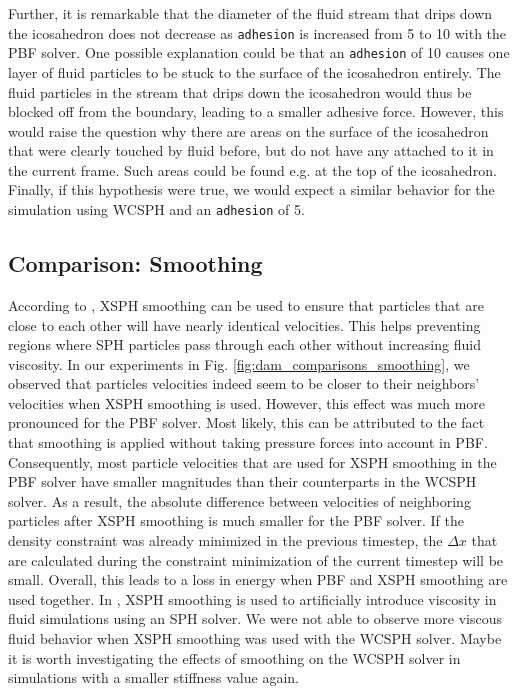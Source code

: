 \documentclass[11pt, letterpaper, twocolumn]{article}
\begin{document}
Further, it is remarkable that the diameter of the fluid stream that drips down the icosahedron does not decrease as \texttt{adhesion} is increased from 5 to 10 with the PBF solver. One possible explanation could be that an \texttt{adhesion} of 10 causes one layer of fluid particles to be stuck to the surface of the icosahedron entirely. The fluid particles
in the stream that drips down the icosahedron would thus be blocked off from the boundary, leading to a smaller adhesive force. However, this would raise the question why there are areas on the surface of the icosahedron that were clearly touched by fluid before, but do not have any attached to it in the current frame. Such areas could be found e.g. at the top
of the icosahedron. Finally, if this hypothesis were true, we would expect a similar behavior for the simulation using WCSPH and an \texttt{adhesion} of 5.

\subsection{Comparison: Smoothing}
According to \cite{monaghan1989}, XSPH smoothing can be used to ensure that particles that are close to each other will have nearly identical velocities. This helps preventing regions where SPH particles pass through each other without increasing fluid viscosity. In our experiments in Fig. \ref{fig:dam_comparisons_smoothing}, we observed that particles velocities 
indeed seem to be closer to their neighbors' velocities when XSPH smoothing is used. However, this effect was much more pronounced for the PBF solver. Most likely, this can be attributed to the fact that smoothing is applied without taking pressure forces into account in PBF. Consequently, most particle velocities that are used for XSPH smoothing in the PBF solver have smaller
magnitudes than their counterparts in the WCSPH solver. As a result, the absolute difference between velocities of neighboring particles after XSPH smoothing is much smaller for the PBF solver. If the density constraint was already minimized in the previous timestep, the $\Delta x$ that are calculated during the constraint minimization of the current timestep will be small.
Overall, this leads to a loss in energy when PBF and XSPH smoothing are used together. In \cite{schechter2012}, XSPH smoothing is used to artificially introduce viscosity in fluid simulations using an SPH solver. We were not able to observe more viscous fluid behavior when XSPH smoothing was used with the WCSPH solver. Maybe it is worth investigating the effects of smoothing
on the WCSPH solver in simulations with a smaller stiffness value again.
\end{document}
